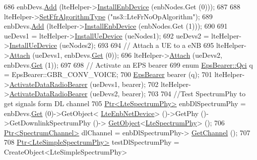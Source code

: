 \begin{DoxyCode}
686   enbDevs.\hyperlink{classns3_1_1NetDeviceContainer_a7ca8bc1d7ec00fd4fcc63869987fbda5}{Add} (lteHelper->\hyperlink{classns3_1_1LteHelper_a5e009ad35ef85f46b5a6099263f15a03}{InstallEnbDevice} (enbNodes.Get (0)));
687 
688   lteHelper->\hyperlink{classns3_1_1LteHelper_a035c6b03305c1511975362f80425b5fc}{SetFfrAlgorithmType} (\textcolor{stringliteral}{"ns3::LteFrNoOpAlgorithm"});
689   enbDevs.\hyperlink{classns3_1_1NetDeviceContainer_a7ca8bc1d7ec00fd4fcc63869987fbda5}{Add} (lteHelper->\hyperlink{classns3_1_1LteHelper_a5e009ad35ef85f46b5a6099263f15a03}{InstallEnbDevice} (enbNodes.Get (1)));
690 
691   ueDevs1 = lteHelper->\hyperlink{classns3_1_1LteHelper_ac9cd932d7de92811cfa953c2e3b2fc9f}{InstallUeDevice} (ueNodes1);
692   ueDevs2 = lteHelper->\hyperlink{classns3_1_1LteHelper_ac9cd932d7de92811cfa953c2e3b2fc9f}{InstallUeDevice} (ueNodes2);
693 
694   \textcolor{comment}{// Attach a UE to a eNB}
695   lteHelper->\hyperlink{classns3_1_1LteHelper_a9466743f826aa2652a87907b7f0a1c87}{Attach} (ueDevs1, enbDevs.\hyperlink{classns3_1_1NetDeviceContainer_a677d62594b5c9d2dea155cc5045f4d0b}{Get} (0));
696   lteHelper->\hyperlink{classns3_1_1LteHelper_a9466743f826aa2652a87907b7f0a1c87}{Attach} (ueDevs2, enbDevs.\hyperlink{classns3_1_1NetDeviceContainer_a677d62594b5c9d2dea155cc5045f4d0b}{Get} (1));
697 
698   \textcolor{comment}{// Activate an EPS bearer}
699   \textcolor{keyword}{enum} \hyperlink{structns3_1_1EpsBearer_aecf0c67109c5eb4ec0b07226fff5885e}{EpsBearer::Qci} q = EpsBearer::GBR\_CONV\_VOICE;
700   \hyperlink{structns3_1_1EpsBearer}{EpsBearer} bearer (q);
701   lteHelper->\hyperlink{classns3_1_1LteHelper_ac896e16cf162e4beeaa292d39ab1b700}{ActivateDataRadioBearer} (ueDevs1, bearer);
702   lteHelper->\hyperlink{classns3_1_1LteHelper_ac896e16cf162e4beeaa292d39ab1b700}{ActivateDataRadioBearer} (ueDevs2, bearer);
703 
704   \textcolor{comment}{//Test SpectrumPhy to get signals form DL channel}
705   \hyperlink{classns3_1_1Ptr}{Ptr<LteSpectrumPhy>} enbDlSpectrumPhy = enbDevs.\hyperlink{classns3_1_1NetDeviceContainer_a677d62594b5c9d2dea155cc5045f4d0b}{Get} (0)->GetObject<
      \hyperlink{classns3_1_1LteEnbNetDevice}{LteEnbNetDevice}> ()->GetPhy ()->GetDownlinkSpectrumPhy ()->
      \hyperlink{classns3_1_1Object_a13e18c00017096c8381eb651d5bd0783}{GetObject}<\hyperlink{classns3_1_1LteSpectrumPhy}{LteSpectrumPhy}> ();
706   \hyperlink{classns3_1_1Ptr}{Ptr<SpectrumChannel>} dlChannel = enbDlSpectrumPhy->
      \hyperlink{classns3_1_1LteSpectrumPhy_a50f13e43568687ee32c5d63e5bf639c2}{GetChannel} ();
707 
708   \hyperlink{classns3_1_1Ptr}{Ptr<LteSimpleSpectrumPhy>} testDlSpectrumPhy = CreateObject<LteSimpleSpectrumPhy>

\end{DoxyCode}
